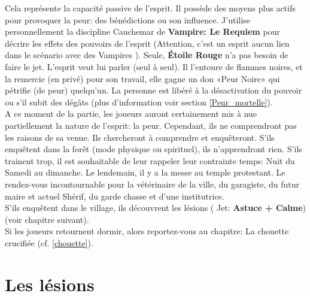 \documentclass[oneside,12pt]{book}
\newcommand\roll[1]{
( Jet: \textbf{#1})
}
\newcommand{\Lynn}{\textbf{Étoile Rouge} }
\begin{document}
\begin{flushleft}
Cela représente la capacité passive de l'esprit. Il possède des moyens plus actifs pour provoquer la peur: des bénédictions ou son influence. J'utilise personnellement la discipline Cauchemar de \textbf{Vampire: Le Requiem} pour décrire les effets des pouvoirs de l'esprit (Attention, c'est un esprit aucun lien dans le scénario avec des Vampires ).
Seule, \Lynn n'a pas besoin de faire le jet. L'esprit veut lui parler (seul à seul). 
Il l'entoure de flammes noires, et la remercie (en privé) pour son travail, elle gagne un don «Peur Noire»  qui pétrifie (de peur) quelqu'un. La personne est libéré à la désactivation du pouvoir ou s'il subit des dégâts (plus d'information voir section \ref{Peur_mortelle}).\\
A ce moment de la partie, les joueurs auront certainement mis à nue partiellement la nature de l'esprit: la peur. Cependant, ils ne comprendront pas les raisons de sa venue. Ils chercheront à comprendre et enquêteront. 
S'ils enquêtent dans la forêt (mode physique ou spirituel), ils n'apprendront rien. 
S'ils trainent trop, il est souhaitable de leur rappeler leur contrainte temps: Nuit du Samedi au dimanche. Le lendemain, il y a la messe au temple protestant. 
Le rendez-vous incontournable pour la vétérinaire de la ville, du garagiste, du futur maire et actuel Shérif, du garde chasse et d'une institutrice.\\  
S'ils enquêtent dans le village, ils découvrent les lésions \roll{Astuce + Calme} (voir chapitre suivant). \\
Si les joueurs retournent dormir, alors reportez-vous au chapitre: La chouette crucifiée (cf. \ref{chouette}). 


\section{Les lésions}

\end{flushleft}
\end{document}
